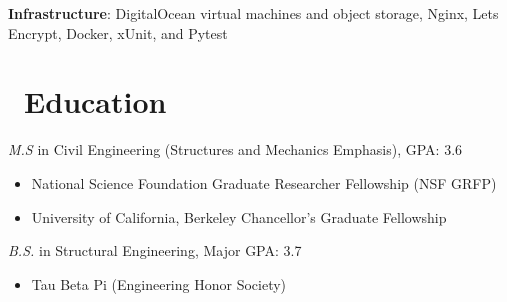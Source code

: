 \documentclass{resume}
\begin{document}
  \textbf{Infrastructure}: DigitalOcean virtual machines and object storage, Nginx, Lets Encrypt, Docker, xUnit, and Pytest


\section{\faGraduationCap\ Education}
\textit{M.S } in Civil Engineering (Structures and Mechanics Emphasis), GPA: 3.6
\begin{itemize}
 \item National Science Foundation Graduate Researcher Fellowship (NSF GRFP)
 \item University of California, Berkeley Chancellor's Graduate Fellowship
\end{itemize}

\textit{B.S.} in Structural Engineering, Major GPA: 3.7
\begin{itemize}
    \item Tau Beta Pi (Engineering Honor Society)
\end{itemize}
\end{document}
